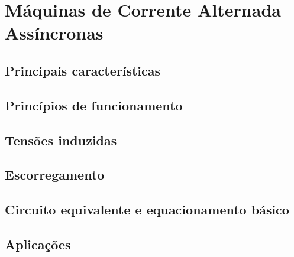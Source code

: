 \section{Máquinas de Corrente Alternada Assíncronas}



\subsection{Principais características}



\subsection{Princípios de funcionamento}



\subsection{Tensões induzidas}



\subsection{Escorregamento}



\subsection{Circuito equivalente e equacionamento básico}



\subsection{Aplicações}



